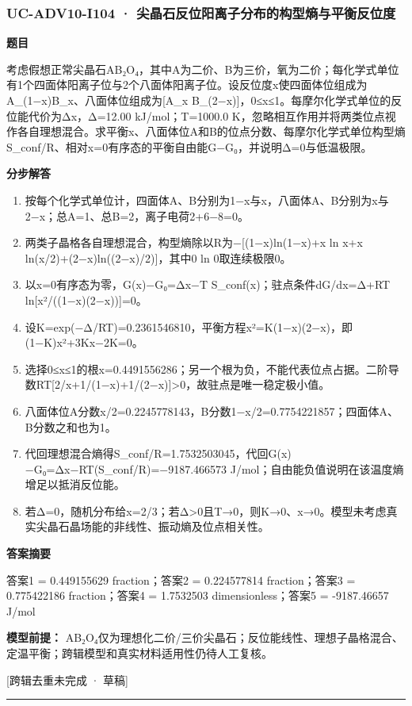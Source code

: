 \documentclass[UTF8,11pt,a4paper]{ctexart}
\begin{document}
\subsubsection*{UC-ADV10-I104 · 尖晶石反位阳离子分布的构型熵与平衡反位度}
\noindent\textbf{题目}\par
考虑假想正常尖晶石AB₂O₄，其中A为二价、B为三价，氧为二价；每化学式单位有1个四面体阳离子位与2个八面体阳离子位。设反位度x使四面体位组成为A\_(1−x)B\_x、八面体位组成为[A\_x B\_(2−x)]，0≤x≤1。每摩尔化学式单位的反位能代价为Δx，Δ=12.00 kJ/mol；T=1000.0 K，忽略相互作用并将两类位点视作各自理想混合。求平衡x、八面体位A和B的位点分数、每摩尔化学式单位构型熵S\_conf/R、相对x=0有序态的平衡自由能G−G₀，并说明Δ=0与低温极限。\par
\medskip\noindent\textbf{分步解答}
\begin{enumerate}
\item 按每个化学式单位计，四面体A、B分别为1−x与x，八面体A、B分别为x与2−x；总A=1、总B=2，离子电荷2+6−8=0。
\item 两类子晶格各自理想混合，构型熵除以R为−[(1−x)ln(1−x)+x ln x+x ln(x/2)+(2−x)ln((2−x)/2)]，其中0 ln 0取连续极限0。
\item 以x=0有序态为零，G(x)−G₀=Δx−T S\_conf(x)；驻点条件dG/dx=Δ+RT ln[x²/((1−x)(2−x))]=0。
\item 设K=exp(−Δ/RT)=0.2361546810，平衡方程x²=K(1−x)(2−x)，即(1−K)x²+3Kx−2K=0。
\item 选择0≤x≤1的根x=0.4491556286；另一个根为负，不能代表位点占据。二阶导数RT[2/x+1/(1−x)+1/(2−x)]>0，故驻点是唯一稳定极小值。
\item 八面体位A分数x/2=0.2245778143，B分数1−x/2=0.7754221857；四面体A、B分数之和也为1。
\item 代回理想混合熵得S\_conf/R=1.7532503045，代回G(x)−G₀=Δx−RT(S\_conf/R)=−9187.466573 J/mol；自由能负值说明在该温度熵增足以抵消反位能。
\item 若Δ=0，随机分布给x=2/3；若Δ>0且T→0，则K→0、x→0。模型未考虑真实尖晶石晶场能的非线性、振动熵及位点相关性。
\end{enumerate}
\noindent\textbf{答案摘要}\par
答案1 = 0.449155629 fraction；答案2 = 0.224577814 fraction；答案3 = 0.775422186 fraction；答案4 = 1.7532503 dimensionless；答案5 = -9187.46657 J/mol\par
\noindent\textbf{模型前提：}
AB₂O₄仅为理想化二价/三价尖晶石；反位能线性、理想子晶格混合、定温平衡；跨辑模型和真实材料适用性仍待人工复核。\par
\noindent\textcolor{red!65!black}{[跨辑去重未完成 · 草稿]} \par
\medskip\hrule\medskip
{}
\end{document}
